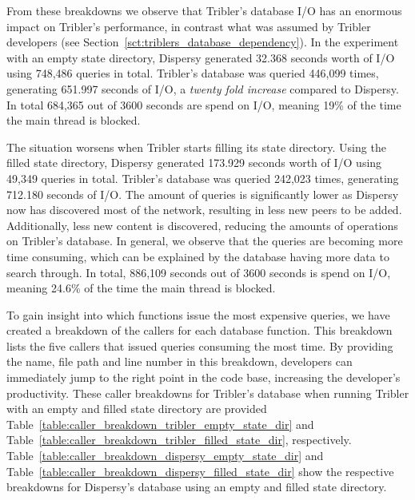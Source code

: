 From these breakdowns we observe that Tribler's database I/O has an enormous impact on Tribler's performance, in contrast what was assumed by Tribler developers (see Section~\ref{sct:triblers_database_dependency}).
In the experiment with an empty state directory, Dispersy generated 32.368 seconds worth of I/O using 748,486 queries in total.
Tribler's database was queried 446,099 times, generating 651.997 seconds of I/O, a \emph{twenty fold increase} compared to Dispersy.
In total 684,365 out of 3600 seconds are spend on I/O, meaning 19\% of the time the main thread is blocked.

The situation worsens when Tribler starts filling its state directory.
Using the filled state directory, Dispersy generated 173.929 seconds worth of I/O using 49,349 queries in total.
Tribler's database was queried 242,023 times, generating 712.180 seconds of I/O.
The amount of queries is significantly lower as Dispersy now has discovered most of the network, resulting in less new peers to be added.
Additionally, less new content is discovered, reducing the amounts of operations on Tribler's database.
In general, we observe that the queries are becoming more time consuming, which can be explained by the database having more data to search through.
In total, 886,109 seconds out of 3600 seconds is spend on I/O, meaning 24.6\% of the time the main thread is blocked.

To gain insight into which functions issue the most expensive queries, we have created a breakdown of the callers for each database function.
This breakdown lists the five callers that issued queries consuming the most time.
By providing the name, file path and line number in this breakdown, developers can immediately jump to the right point in the code base, increasing the developer's productivity.
These caller breakdowns for Tribler's database when running Tribler with an empty and filled state directory are provided Table~\ref{table:caller_breakdown_tribler_empty_state_dir} and Table~\ref{table:caller_breakdown_tribler_filled_state_dir}, respectively.
Table~\ref{table:caller_breakdown_dispersy_empty_state_dir} and Table~\ref{table:caller_breakdown_dispersy_filled_state_dir} show the respective breakdowns for Dispersy's database using an empty and filled state directory.
	
